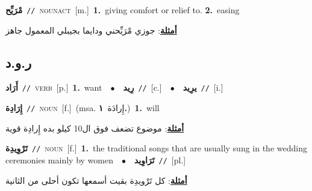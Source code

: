 \documentclass[10pt,a4paper,twoside]{article} %
\begin{document}
\begin{multicols}{2}
{\setlength\topsep{0pt}\textbf{\foreignlanguage{arabic}{مْرَيِّح}}\ {\color{gray}\texttt{//}\color{black}}\ \textsc{noun\textunderscore act}\ [m.]\ \textbf{1.}~giving comfort or relief to.  \textbf{2.}~easing\  \begin{flushright}\color{gray}\foreignlanguage{arabic}{\textbf{\underline{\foreignlanguage{arabic}{أمثلة}}}: جوزي مْرَيِّحني ودايما بجيبلي المعمول جاهز}\end{flushright}\color{black}} \vspace{2mm}

\vspace{-3mm}
\subsection*{\color{blue}\foreignlanguage{arabic}{ر.و.د}\color{blue}{}} 

{\setlength\topsep{0pt}\textbf{\foreignlanguage{arabic}{أَرَاد}}\ {\color{gray}\texttt{//}\color{black}}\ \textsc{verb}\ [p.]\ \textbf{1.}~want\ \ $\bullet$\ \ \setlength\topsep{0pt}\textbf{\foreignlanguage{arabic}{رِيد}}\ {\color{gray}\texttt{//}\color{black}}\ [c.]\ \ $\bullet$\ \ \setlength\topsep{0pt}\textbf{\foreignlanguage{arabic}{يرِيد}}\ {\color{gray}\texttt{//}\color{black}}\ [i.]\ } \vspace{2mm}

{\setlength\topsep{0pt}\textbf{\foreignlanguage{arabic}{إِرَادِة}}\ {\color{gray}\texttt{//}\color{black}}\ \textsc{noun}\ [f.]\ \color{gray}(msa. \foreignlanguage{arabic}{إِرادَة}~\foreignlanguage{arabic}{\textbf{١.}})\color{black}\ \textbf{1.}~will\  \begin{flushright}\color{gray}\foreignlanguage{arabic}{\textbf{\underline{\foreignlanguage{arabic}{أمثلة}}}: موضوع تضعف فوق ال10 كيلو بده إِرادِة قوية}\end{flushright}\color{black}} \vspace{2mm}

{\setlength\topsep{0pt}\textbf{\foreignlanguage{arabic}{تَرْوِيدِة}}\ {\color{gray}\texttt{//}\color{black}}\ \textsc{noun}\ [f.]\ \textbf{1.}~the traditional songs that are usually sung in the wedding ceremonies mainly by women\ \ $\bullet$\ \ \setlength\topsep{0pt}\textbf{\foreignlanguage{arabic}{تَرَاوِيد}}\ {\color{gray}\texttt{//}\color{black}}\ [pl.]\  \begin{flushright}\color{gray}\foreignlanguage{arabic}{\textbf{\underline{\foreignlanguage{arabic}{أمثلة}}}: كل تَرْويدِة بقيت أسمعها تكون أحلى من الثانية}\end{flushright}\color{black}} \vspace{2mm}


\end{multicols}
\end{document}
